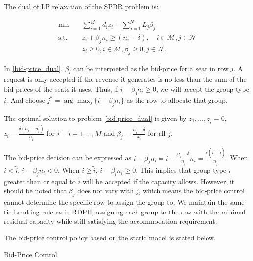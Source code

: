 The dual of LP relaxation of the SPDR problem is:

\begin{equation}\label{bid-price_dual}
  \begin{aligned}
  \min \quad & \sum_{i=1}^{M} d_i z_i + \sum_{j= 1}^{N} L_j \beta_{j} \\
  \text {s.t.} \quad & z_{i} + \beta_j n_i \geq (n_i-\delta), \quad i \in \mathcal{M}, j \in \mathcal{N} \\
  & z_{i} \geq 0, i \in \mathcal{M}, \beta_{j} \geq 0, j \in \mathcal{N}.
  \end{aligned}
\end{equation}

In \eqref{bid-price_dual}, $\beta_{j}$ can be interpreted as the bid-price for a seat in row $j$. A request is only accepted if the revenue it generates is no less than the sum of the bid prices of the seats it uses. Thus, if $i -\beta_{j} n_i \geq 0$, we will accept the group type $i$. And choose $j^{*} = \arg \max_{j} \{i -\beta_{j} n_i\}$ as the row to allocate that group.


\begin{lem}\label{bid-price}
 The optimal solution to problem \eqref{bid-price_dual} is given by $z_1 ,\ldots, z_{\tilde{i}} =0$, $z_{i} = \frac{\delta(n_i-n_{\tilde{i}})}{n_{\tilde{i}}}$ for $i = \tilde{i}+1, \ldots, M$ and $\beta_j = \frac{n_{\tilde{i}} - \delta}{n_{\tilde{i}}}$ for all $j$.
\end{lem}

The bid-price decision can be expressed as $i - \beta_j n_i = i - \frac{n_{\tilde{i}} - \delta}{n_{\tilde{i}}} n_i = \frac{\delta (i - \tilde{i})}{n_{\tilde{i}}}$. When $i < \tilde{i}$, $i - \beta_j n_i < 0$. When $i \geq \tilde{i}$, $i - \beta_j n_i \geq 0$. This implies that group type $i$ greater than or equal to $\tilde{i}$ will be accepted if the capacity allows. However, it should be noted that $\beta_j$ does not vary with $j$, which means the bid-price control cannot determine the specific row to assign the group to. We maintain the same tie-breaking rule as in RDPH, assigning each group to the row with the minimal residual capacity while still satisfying the accommodation requirement.


The bid-price control policy based on the static model is stated below.

\begin{algorithm}[H]
  \caption{Bid-Price Control}\label{algo_bid}
\end{algorithm}


